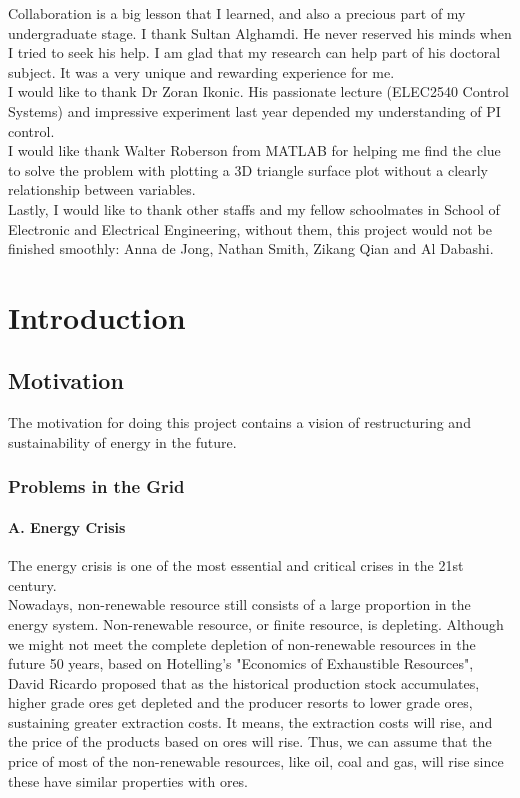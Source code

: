 \documentclass{report}
\begin{document}
Collaboration is a big lesson that I learned, and also a precious part of my undergraduate stage. I thank Sultan Alghamdi. He never reserved his minds when I tried to seek his help. I am glad that my research can help part of his doctoral subject. It was a very unique and rewarding experience for me.\\

I would like to thank Dr Zoran Ikonic. His passionate lecture (ELEC2540 Control Systems) and impressive experiment last year depended my understanding of PI control.\\

I would like thank Walter Roberson from MATLAB for helping me find the clue to solve the problem with plotting a 3D triangle surface plot without a clearly relationship between variables.\\

Lastly, I would like to thank other staffs and my fellow schoolmates in School of Electronic and Electrical Engineering, without them, this project would not be finished smoothly: Anna de Jong, Nathan Smith, Zikang Qian and Al Dabashi.\\



\afterpreface
\chapter{Introduction}
\section{Motivation} %
The motivation for doing this project contains a vision of restructuring and sustainability of energy in the future.
\subsection{Problems in the Grid}
\subsubsection{A. Energy Crisis}
The energy crisis is one of the most essential and critical crises in the 21st century.\\

Nowadays, non-renewable resource still consists of a large proportion in the energy system. Non-renewable resource, or finite resource, is depleting. Although we might not meet the complete depletion of non-renewable resources in the future 50 years, based on Hotelling’s "Economics of Exhaustible Resources", David Ricardo proposed that as the historical production stock accumulates, higher grade ores get depleted and the producer resorts to lower grade ores, sustaining greater extraction costs. It means, the extraction costs will rise, and the price of the products based on ores will rise. Thus, we can assume that the price of most of the non-renewable resources, like oil, coal and gas, will rise since these have similar properties with ores.\\
\end{document}
